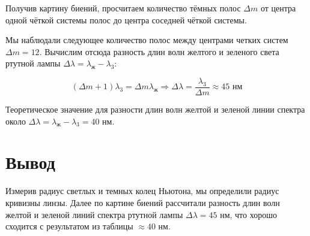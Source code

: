 Получив картину биений, просчитаем количество тёмных полос $\Delta m$ от центра одной чёткой системы полос до центра соседней чёткой системы.

Мы наблюдали следующее количество полос между центрами четких систем $\Delta m = 12$. Вычислим отсюда разность длин волн желтого и зеленого света ртутной лампы $\Delta \lambda = \lambda_{\text{ж}} - \lambda_{\text{3}}$:

$$
(\Delta m + 1)\lambda_{\text{3}} = \Delta m\lambda_{\text{ж}} \Rightarrow \Delta \lambda = \frac{\lambda_{\text{3}}}{\Delta m} \approx {45}{\text{ нм}}
$$

Теоретическое значение для разности длин волн желтой и зеленой линии спектра около $\Delta \lambda = \lambda_{\text{ж}} - \lambda_{\text{3}} = 40$ нм.


\section*{Вывод}

Измерив радиус светлых и темных колец Ньютона, мы определили радиус кривизны линзы. Далее по картине биений рассчитали разность длин волн желтой и зеленой линий спектра ртутной лампы $\Delta \lambda = 45$ нм, что хорошо сходится с результатом из таблицы $\approx 40$ нм.

